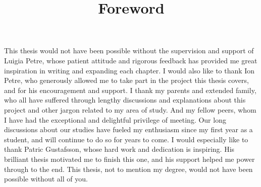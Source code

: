 \title{Foreword}

This thesis would not have been possible without the supervision and support of Luigia Petre, whose patient attitude and rigorous feedback has provided me great inspiration in writing and expanding each chapter. I would also like to thank Ion Petre, who generously allowed me to take part in the project this thesis covers, and for his encouragement and support. I thank my parents and extended family, who all have suffered through lengthy discussions and explanations about this project and other jargon related to my area of study. And my fellow peers, whom I have had the exceptional and delightful privilege of meeting. Our long discussions about our studies have fueled my enthusiasm since my first year as a student, and will continue to do so for years to come. I would especially like to thank Patric Gustafsson, whose hard work and dedication is inspiring. His brilliant thesis motivated me to finish this one, and his support helped me power through to the end. This thesis, not to mention my degree, would not have been possible without all of you.